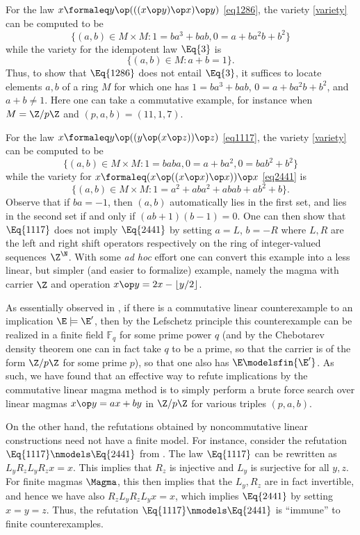 \begin{example}\label{1286-ex} For the law $x \formaleq y \op (((x \op y) \op x) \op y)$ \eqref{eq1286}, the variety \eqref{variety} can be computed to be
$$ \{ (a,b) \in M \times M: 1 = ba^3+bab, 0 = a + ba^2 b + b^2 \}$$
while the variety for the idempotent law $\Eq{3}$ is
$$ \{ (a,b) \in M: a+b=1 \}.$$
Thus, to show that $\Eq{1286}$ does not entail $\Eq{3}$, it suffices to locate elements $a,b$ of a ring $M$ for which one has $1 = ba^3+bab$, $0 = a + ba^2 b + b^2$, and $a+b \neq 1$.  Here one can take a commutative example, for instance when $M = \Z/p\Z$ and $(p,a,b) = (11,1,7)$.
\end{example}

\begin{example}\label{1117-ex} For the law $x \formaleq y \op ((y \op (x \op z)) \op z)$ \eqref{eq1117}, the variety \eqref{variety} can be computed to be
$$ \{ (a,b) \in M \times M: 1 = baba, 0 = a+ba^2, 0 = bab^2 + b^2 \}$$
while the variety for $x \formaleq (x \op ((x \op x) \op x)) \op x$ \eqref{eq2441} is
$$ \{ (a,b) \in M \times M: 1 = a^2 + aba^2 + abab + ab^2 + b \}.$$
Observe that if $ba = -1$, then $(a,b)$ automatically lies in the first set, and lies in the second set if and only if $(ab+1)(b-1) = 0$.  One can then show that $\Eq{1117}$ does not imply $\Eq{2441}$ by setting $a = L$, $b = -R$ where $L, R$ are the left and right shift operators respectively on the ring of integer-valued sequences $\Z^\N$.  With some \emph{ad hoc} effort one can convert this example into a less linear, but simpler (and easier to formalize) example, namely the magma with carrier $\Z$ and operation $x \op y = 2x - \lfloor y/2 \rfloor$.
\end{example}

\begin{remark} As essentially observed in \cite{austin}, if there is a commutative linear counterexample to an implication $\E \models {\E'}$, then by the Lefschetz principle this counterexample can be realized in a finite field ${\mathbb F}_q$ for some prime power $q$ (and by the Chebotarev density theorem one can in fact take $q$ to be a prime, so that the carrier is of the form $\Z/p\Z$ for some prime $p$), so that one also has $\E \modelsfin {\E'}$.  As such, we have found that an effective way to refute implications by the commutative linear magma method is to simply perform a brute force search over linear magmas $x \op y = ax + by$ in $\Z/p\Z$ for various triples $(p,a,b)$.

On the other hand, the refutations obtained by noncommutative linear constructions need not have a finite model.  For instance, consider the refutation $\Eq{1117} \nmodels \Eq{2441}$ from .  The law $\Eq{1117}$ can be rewritten as $L_y R_z L_y R_z x = x$.  This implies that $R_z$ is injective and $L_y$ is surjective for all $y,z$.  For finite magmas $\Magma$, this then implies that the $L_y, R_z$ are in fact invertible, and hence we have also $R_z L_y R_z L_y x = x$, which implies $\Eq{2441}$ by setting $x=y=z$.  Thus, the refutation $\Eq{1117} \nmodels \Eq{2441}$ is ``immune'' to finite counterexamples.
\end{remark}

